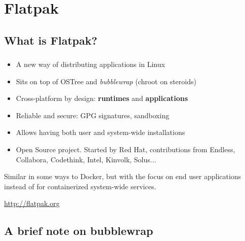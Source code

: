 %
%
%

\section{Flatpak}
\subsection{What is Flatpak?}

\begin{frame}
  \frametitle{\insertsubsection}

    \begin{itemize}
    \item A new way of distributing applications in Linux\vspacing
    \item Sits on top of OSTree and \textit{bubblewrap} (chroot on steroids)\vspacing
    \item Cross-platform by design: \textbf{runtimes} and \textbf{applications}\vspacing
    \item Reliable and secure: GPG signatures, sandboxing\vspacing
    \item Allows having both user and system-wide installations\vspacing
    \item Open Source project. Started by Red Hat, contributions from Endless, Collabora, Codethink, Intel, Kinvolk, Solus...
    \end{itemize}

    \begin{flushleft}
      Similar in some ways to Docker, but with the focus on end user
      applications instead of for containerized system-wide services.
    \end{flushleft}

  \begin{center}
    \url{http://flatpak.org}
  \end{center}
\end{frame}

\subsection{A brief note on bubblewrap}


